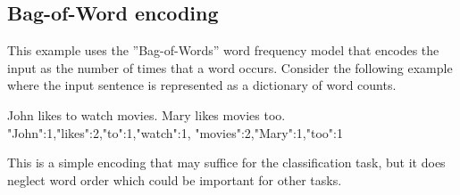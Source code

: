 \begin{advanced}

\subsection[Bag-ofWord encoding]{Bag-of-Word encoding}

This example uses the ''Bag-of-Words''  word frequency model that encodes the input as the number of times that a word occurs. Consider the following example where the input sentence is represented as a dictionary of word counts. 

\begin{textcode}
John likes to watch movies. Mary likes movies too.
{"John":1,"likes":2,"to":1,"watch":1, "movies":2,"Mary":1,"too":1}
\end{textcode}

This is a simple encoding that may suffice for the classification task, but it does neglect word order which could be important for other tasks. 

\end{advanced}

